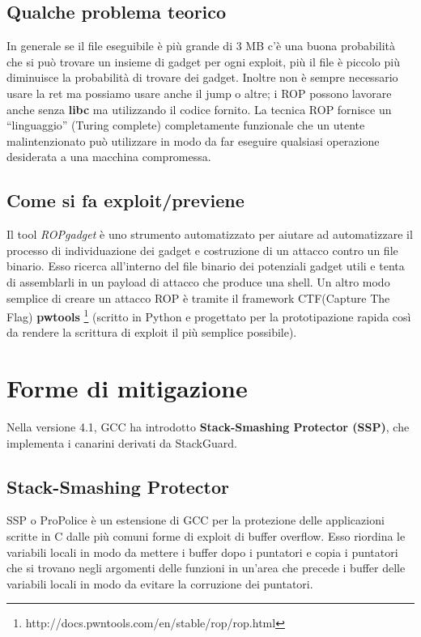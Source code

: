 \subsection{Qualche problema teorico}

In generale se il file eseguibile è più grande di 3 MB c'è una buona probabilità
che si può trovare un insieme di gadget per ogni exploit, più il file è piccolo più
diminuisce la probabilità di trovare dei gadget. Inoltre non è sempre necessario usare
la ret ma possiamo usare anche il jump o altre; i ROP possono lavorare anche
senza \textbf{libc} ma utilizzando il codice fornito. La tecnica ROP fornisce un
``linguaggio'' (Turing complete) completamente funzionale che un utente malintenzionato
può utilizzare
in modo da far eseguire  qualsiasi operazione desiderata a una macchina compromessa.

\subsection{Come si fa exploit/previene}

Il tool \textit{ROPgadget} è uno strumento automatizzato per aiutare ad automatizzare
il processo di individuazione dei gadget e costruzione di un attacco contro un file
binario. Esso ricerca all'interno del file binario dei potenziali gadget utili e
tenta di assemblarli in un payload di attacco che produce una shell. Un altro modo
semplice di creare un attacco ROP è tramite il framework
CTF(Capture The Flag) \textbf{pwtools} \footnote{http://docs.pwntools.com/en/stable/rop/rop.html} (scritto in Python e progettato per la prototipazione rapida così da rendere
la scrittura di exploit il più semplice possibile).


\newpage
\section{Forme di mitigazione}

Nella versione 4.1, GCC ha introdotto \textbf{Stack-Smashing Protector (SSP)},
che implementa i canarini derivati da StackGuard.

\subsection{Stack-Smashing Protector}

SSP o ProPolice è un estensione di GCC per la protezione delle applicazioni scritte
in C dalle più comuni forme di exploit di buffer overflow. Esso riordina le variabili
locali in modo da mettere i buffer dopo i puntatori e copia i puntatori che si trovano
negli argomenti delle funzioni in un'area che precede i buffer delle variabili locali
in modo da evitare la corruzione dei puntatori.

